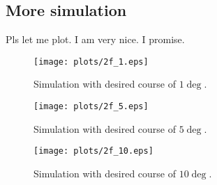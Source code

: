 \subsection{More simulation}

Pls let me plot. I am very nice. I promise.\\

\begin{figure}[h!]
    \centering
    \texttt{[image: plots/2f\_1.eps]}
    \caption{Simulation with desired course of $1 \deg$.}
    \label{fig:2f_1}
\end{figure}
\begin{figure}[h!]
    \centering
    \texttt{[image: plots/2f\_5.eps]}
    \caption{Simulation with desired course of $5 \deg$.}
    \label{fig:2f_5}
\end{figure}
\begin{figure}[h!]
    \centering
    \texttt{[image: plots/2f\_10.eps]}
    \caption{Simulation with desired course of $10 \deg$.}
    \label{fig:2f_10}
\end{figure}